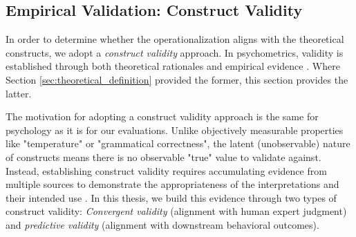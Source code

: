 




\subsection{Empirical Validation: Construct Validity}\label{sec:empirical_validation}

In order to determine whether the operationalization aligns with the theoretical constructs, we adopt a \textit{construct validity} approach. In psychometrics, validity is established through both theoretical rationales and empirical evidence \citep{messick1989meaning}. Where Section \ref{sec:theoretical_definition} provided the former, this section provides the latter. %

The motivation for adopting a construct validity approach is the same for psychology as it is for our evaluations. Unlike objectively measurable properties like "temperature" or "grammatical correctness", the latent (unobservable) nature of constructs means there is no observable "true" value to validate against. Instead, establishing construct validity requires accumulating evidence from multiple sources to demonstrate the appropriateness of the interpretations and their intended use \citep{messick1989meaning}. In this thesis, we build this evidence through two types of construct validity: \textit{Convergent validity} (alignment with human expert judgment) and \textit{predictive validity} (alignment with downstream behavioral outcomes). 

